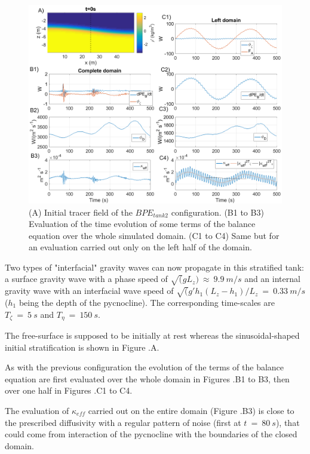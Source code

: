 \begin{figure}[h!]
\centering
\includegraphics[width=1\textwidth]{./CHAP_BPE/Fig_TANK_pyc.png}
\caption[Initial tracer field and evaluation of $\kappa_{eff}$ for configuration $BPE_{tank2}$]{(A) Initial tracer field of the $BPE_{tank2}$ configuration. (B1 to B3) Evaluation of the time evolution of some terms of the balance equation  over the whole simulated domain. (C1 to C4) Same but for an evaluation carried out only on the left half of the domain.}
\label{figCpsin}
\end{figure}
Two types of "interfacial" gravity waves can now propagate in this stratified tank: a surface gravity wave with a phase speed of $\sqrt(g L_z) \ \approx \ 9.9\ m/s$ and an internal gravity wave with an interfacial wave speed of $\sqrt(g' h_1 (L_z-h_1)/L_z\ =\ 0.33\ m/s$ ($h_1$ being the depth of the pycnocline). The corresponding time-scales are $T_{\zeta} \ = \ 5 \ s$ and $T_{\eta} \ = \ 150 \ s$.

The free-surface is supposed to be initially at rest whereas the sinusoidal-shaped initial stratification is shown in Figure .A.

As with the previous configuration the evolution of the terms of the balance equation  are first evaluated over the whole domain in Figures .B1 to B3, then over one half in Figures .C1 to C4.

The evaluation of $\kappa_{eff}$ carried out on the entire domain (Figure .B3) is close to the prescribed diffusivity with a regular pattern of noise (first at $t\ =\ 80\ s$), that could come from interaction of the pycnocline with the boundaries of the closed domain.

